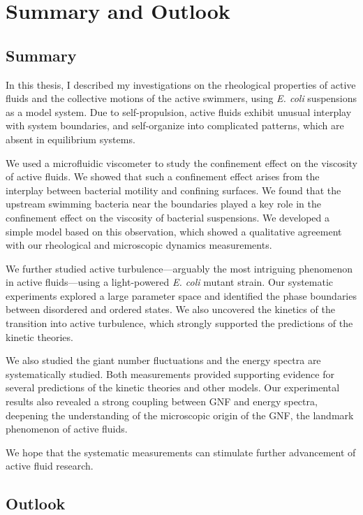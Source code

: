 \chapter{Summary and Outlook}
\label{summary-and-outlook}
\section{Summary}

In this thesis, I described my investigations on the rheological properties of active fluids and the collective motions of the active swimmers, using \textit{E. coli} suspensions as a model system. Due to self-propulsion, active fluids exhibit unusual interplay with system boundaries, and self-organize into complicated patterns, which are absent in equilibrium systems.

We used a microfluidic viscometer to study the confinement effect on the viscosity of active fluids. We showed that such a confinement effect arises from the interplay between bacterial motility and confining surfaces. We found that the upstream swimming bacteria near the boundaries played a key role in the confinement effect on the viscosity of bacterial suspensions. We developed a simple model based on this observation, which showed a qualitative agreement with our rheological and microscopic dynamics measurements.

We further studied active turbulence---arguably the most intriguing phenomenon in active fluids---using a light-powered \textit{E. coli} mutant strain. Our systematic experiments explored a large parameter space and identified the phase boundaries between disordered and ordered states. We also uncovered the kinetics of the transition into active turbulence, which strongly supported the predictions of the kinetic theories.

We also studied the giant number fluctuations and the energy spectra are systematically studied. Both measurements provided supporting evidence for several  predictions of the kinetic theories and other models. Our experimental results also revealed a strong coupling between GNF and energy spectra, deepening the understanding of the microscopic origin of the GNF, the landmark phenomenon of active fluids.

We hope that the systematic measurements can stimulate further advancement of active fluid research.

\section{Outlook}

